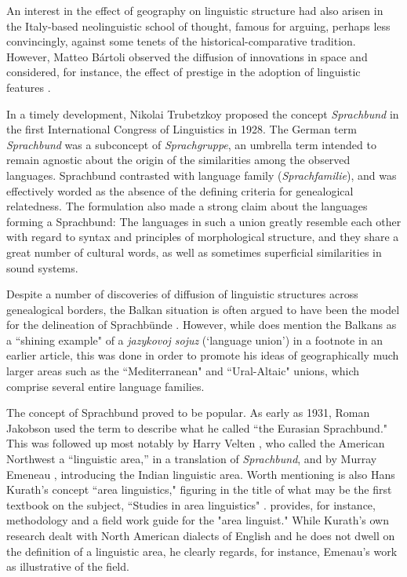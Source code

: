 \documentclass[output=paper]{langscibook}
\begin{document}
An interest in the effect of geography on linguistic structure had also arisen in the Italy-based neolinguistic school of thought, famous for arguing, perhaps less convincingly, against some tenets of the historical-comparative tradition. However, Matteo Bártoli observed the diffusion of innovations in space and considered, for instance, the effect of prestige in the adoption of linguistic features \parencite{Hall1946}. 

In a timely development, Nikolai Trubetzkoy \parencite*[18]{trubetzkoy28} proposed the concept \textit{Sprachbund} in the first International Congress of Linguistics in 1928. The German term \textit{Sprachbund} was a subconcept of \textit{Sprachgruppe}, an umbrella term intended to remain agnostic about the origin of the similarities among the observed languages. Sprachbund contrasted with language family (\textit{Sprachfamilie}), and was effectively worded as the absence of the defining criteria for genealogical relatedness. The formulation also made a strong claim about the languages forming a Sprachbund: The languages in such a union greatly resemble each other with regard to syntax and principles of morphological structure, and they share a great number of cultural words, as well as sometimes superficial similarities in sound systems. 

Despite a number of discoveries of diffusion of linguistic structures across genealogical borders, the Balkan situation is often argued to have been the model for the delineation of Sprachbünde \parencite[see, e.g.,][276]{friedman11}. However, while \textcite{trubetzkoy1923} does mention the Balkans as a ``shining example" of a \textit{jazykovoj sojuz} (`language union') in a footnote in an earlier article, this was done in order to promote his ideas of geographically much larger areas such as the ``Mediterranean" and ``Ural-Altaic" unions, which comprise several entire language families.

The concept of Sprachbund proved to be popular. As early as 1931, Roman Jakobson \parencite*{jakobson31} used the term to describe what he called ``the Eurasian Sprachbund." This was followed up most notably by Harry Velten \parencite*[271]{velten43}, who called the American Northwest a ``linguistic area,” in a translation of \textit{Sprachbund}, and by Murray Emeneau \parencite*{emeneau56}, introducing the Indian linguistic area. Worth mentioning is also Hans Kurath's concept ``area linguistics," figuring in the title of what may be the first textbook on the subject, ``Studies in area linguistics" \parencite{kurath1972studies}. \textcite[1--23]{kurath1972studies} provides, for instance, methodology and a field work guide for the "area linguist." While Kurath's own research dealt with North American dialects of English and he does not dwell on the definition of a linguistic area, he clearly regards, for instance, Emenau's \parencite*{emeneau56} work as illustrative of the field. 
\end{document}
